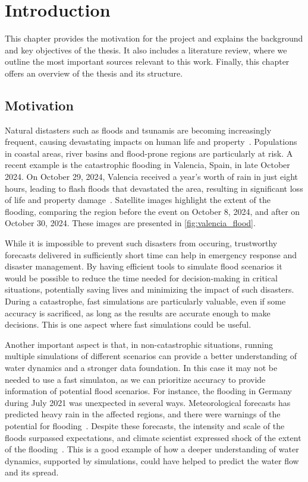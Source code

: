 \chapter{Introduction}
This chapter provides the motivation for the project and explains the background and key objectives of the thesis.
It also includes a literature review, where we outline the most important sources relevant to this work.
Finally, this chapter offers an overview of the thesis and its structure.

\section{Motivation}
Natural distasters such as floods and tsunamis are becoming increasingly frequent, causing devastating impacts on human life and property~\cite{najibi2018global_floods}.
Populations in coastal areas, river basins and flood-prone regions are particularly at risk.
A recent example is the catastrophic flooding in Valencia, Spain, in late October 2024.
On October 29, 2024, Valencia received a year's worth of rain in just eight hours, leading to flash floods that devastated the area, resulting in significant loss of life and property damage~\cite{valencia_flood_disaster_esa}.
Satellite images highlight the extent of the flooding, comparing the region before the event on October 8, 2024, and after on October 30, 2024.
These images are presented in \autoref{fig:valencia_flood}.

While it is impossible to prevent such disasters from occuring, trustworthy forecasts delivered in sufficiently short time can help in emergency response and disaster management.
By having efficient tools to simulate flood scenarios it would be possible to reduce the time needed for decision-making in critical situations, potentially saving lives and minimizing the impact of such disasters.
During a catastrophe, fast simulations are particularly valuable, even if some accuracy is sacrificed, as long as the results are accurate enough to make decisions.
This is one aspect where fast simulations could be useful.

Another important aspect is that, in non-catastrophic situations, running multiple simulations of different scenarios can provide a better understanding of water dynamics and a stronger data foundation.
In this case it may not be needed to use a fast simulaton, as we can prioritize accuracy to provide information of potential flood scenarios.
For instance, the flooding in Germany during July 2021 was unexpected in several ways.
Meteorological forecasts has predicted heavy rain in the affected regions, and there were warnings of the potential for flooding~\cite{fathom_floods_2021}.
Despite these forecasts, the intensity and scale of the floods surpassed expectations, and climate scientist expressed shock of the extent of the flooding~\cite{guardian_floods_2021}.
This is a good example of how a deeper understanding of water dynamics, supported by simulations, could have helped to predict the water flow and its spread.

